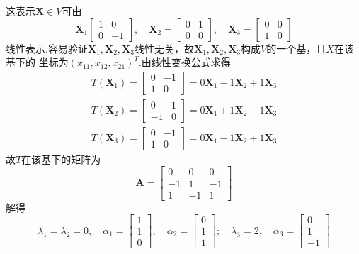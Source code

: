 \documentclass[12pt, a4paper, oneside, fontset=none]{ctexart}
\begin{document}
这表示$\bm{X} \in V$可由
\[
    \bm{X}_1 \begin{bmatrix}
        1 & 0  \\
        0 & -1
    \end{bmatrix}, \quad \bm{X}_2 = \begin{bmatrix}
        0 & 1 \\
        0 & 0
    \end{bmatrix}, \quad \bm{X}_3 = \begin{bmatrix}
        0 & 0 \\
        1 & 0
    \end{bmatrix}
\]
线性表示.容易验证$\bm{X}_1, \bm{X}_2, \bm{X}_3$线性无关，故$\bm{X}_1, \bm{X}_2, \bm{X}_3$构成$V$的一个基，且$X$在该基下的
坐标为$(x_{11},x_{12},x_{21})^T$.由线性变换公式求得
\begin{gather*}
    T(\bm{X}_1) = \begin{bmatrix}
        0 & -1 \\
        1 & 0
    \end{bmatrix} = 0\bm{X}_1 - 1\bm{X}_2 + 1\bm{X}_3 \\
    T(\bm{X}_2) = \begin{bmatrix}
        0  & 1 \\
        -1 & 0
    \end{bmatrix} = 0\bm{X}_1 + 1\bm{X}_2 - 1\bm{X}_3 \\
    T(\bm{X}_3) = \begin{bmatrix}
        0 & -1 \\
        1 & 0
    \end{bmatrix} = 0\bm{X}_1 - 1\bm{X}_2 + 1\bm{X}_3
\end{gather*}
故$T$在该基下的矩阵为
\[
    \bm{A} = \begin{bmatrix}
        0  & 0  & 0  \\
        -1 & 1  & -1 \\
        1  & -1 & 1
    \end{bmatrix}
\]
解得
\[
    \lambda_1 = \lambda_2 = 0, \quad \alpha_1 = \begin{bmatrix}
        1 \\
        1 \\
        0
    \end{bmatrix}, \quad \alpha_2 = \begin{bmatrix}
        0 \\
        1 \\
        1
    \end{bmatrix}; \quad \lambda_3 = 2, \quad \alpha_3 = \begin{bmatrix}
        0 \\
        1 \\
        -1
    \end{bmatrix}
\]
\end{document}
